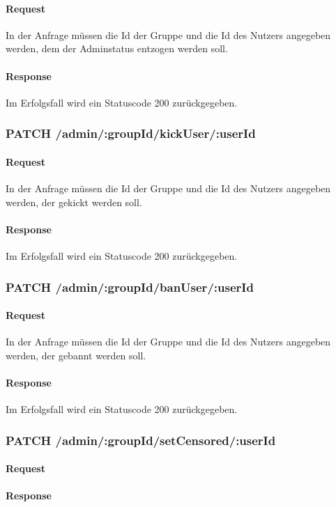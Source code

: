 \documentclass{entwurfsheft}
\begin{document}
\paragraph{Request}
In der Anfrage müssen die Id der Gruppe und die Id des Nutzers angegeben werden, dem der Adminstatus entzogen werden soll.
\paragraph{Response}
Im Erfolgsfall wird ein Statuscode 200 zurückgegeben.

\subsubsection*{PATCH /admin/:groupId/kickUser/:userId}
\paragraph{Request}
In der Anfrage müssen die Id der Gruppe und die Id des Nutzers angegeben werden, der gekickt werden soll.
\paragraph{Response}
Im Erfolgsfall wird ein Statuscode 200 zurückgegeben.

\subsubsection*{PATCH /admin/:groupId/banUser/:userId}
\paragraph{Request}
In der Anfrage müssen die Id der Gruppe und die Id des Nutzers angegeben werden, der gebannt werden soll.
\paragraph{Response}
Im Erfolgsfall wird ein Statuscode 200 zurückgegeben.
\subsubsection*{PATCH /admin/:groupId/setCensored/:userId}
    \paragraph{Request}
    \paragraph{Response}
\end{document}
